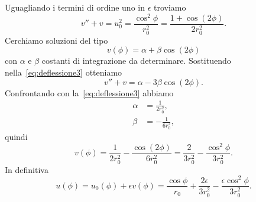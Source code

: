 Uguagliando i termini di ordine uno in $\epsilon$ troviamo
\begin{equation}
  \label{eq:deflessione3}
  v'' + v = u_{0}^{2} = \frac{\cos^{2}\phi}{r_{0}^{2}} = \frac{1 +
    \cos(2\phi)}{2r_{0}^{2}}.
\end{equation}
Cerchiamo soluzioni del tipo
\begin{equation}
  v(\phi) = \alpha + \beta\cos(2\phi)
\end{equation}
con $\alpha$ e $\beta$ costanti di integrazione da determinare.  Sostituendo
nella~\eqref{eq:deflessione3} otteniamo
\begin{equation}
  v'' + v = \alpha - 3\beta\cos(2\phi).
\end{equation}
Confrontando con la~\eqref{eq:deflessione3} abbiamo
\begin{subequations}
  \begin{align}
    \alpha &= \frac{1}{2r_{0}^{2}}, \\
    \beta &= - \frac{1}{6r_{0}^{2}},
  \end{align}
\end{subequations}
quindi
\begin{equation}
  v(\phi) = \frac{1}{2r_{0}^{2}} - \frac{\cos(2\phi)}{6r_{0}^{2}} =
  \frac{2}{3r_{0}^{2}} - \frac{\cos^{2}\phi}{3r_{0}^{2}}.
\end{equation}
In definitiva
\begin{equation}
  \label{eq:deflessione4}
  u(\phi) = u_{0}(\phi) + \epsilon v(\phi) = \frac{\cos\phi}{r_{0}} +
  \frac{2\epsilon}{3r_{0}^{2}} - \frac{\epsilon\cos^{2}\phi}{3r_{0}^{2}}.
\end{equation}

